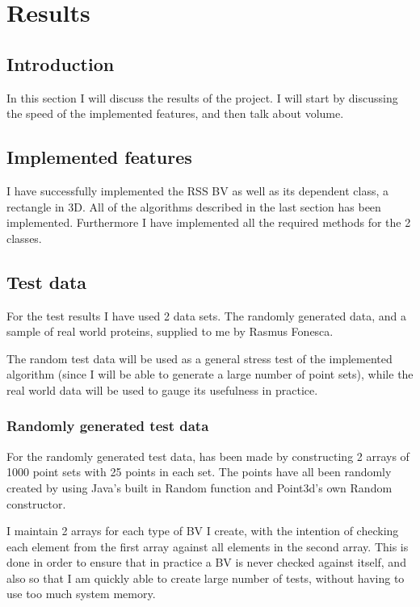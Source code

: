 
\section{Results}
\label{results}
\subsection{Introduction}
In this section I will discuss the results of the project. I will start by discussing the speed of the implemented features, and then talk about volume.

\subsection{Implemented features}
I have successfully implemented the RSS BV as well as its dependent class, a rectangle in 3D. 
All of the algorithms described in the last section has been implemented.
Furthermore I have implemented all the required methods for the 2 classes.

\subsection{Test data}
For the test results I have used 2 data sets. The randomly generated data, and a sample of real world proteins, supplied to me by Rasmus Fonesca.

The random test data will be used as a general stress test of the implemented algorithm (since I will be able to generate a large number of point sets), while the real world data will be used to gauge its usefulness in practice.

\subsubsection{Randomly generated test data}
For the randomly generated test data, has been made by constructing 2 arrays of 1000 point sets with 25 points in each set. The points have all been randomly created by using Java's built in Random function and Point3d's own Random constructor.

I maintain 2 arrays for each type of BV I create, with the intention of checking each element from the first array against all elements in the second array. This is done in order to ensure that in practice a BV is never checked against itself, and also so that I am quickly able to create large number of tests, without having to use too much system memory. \\ 

